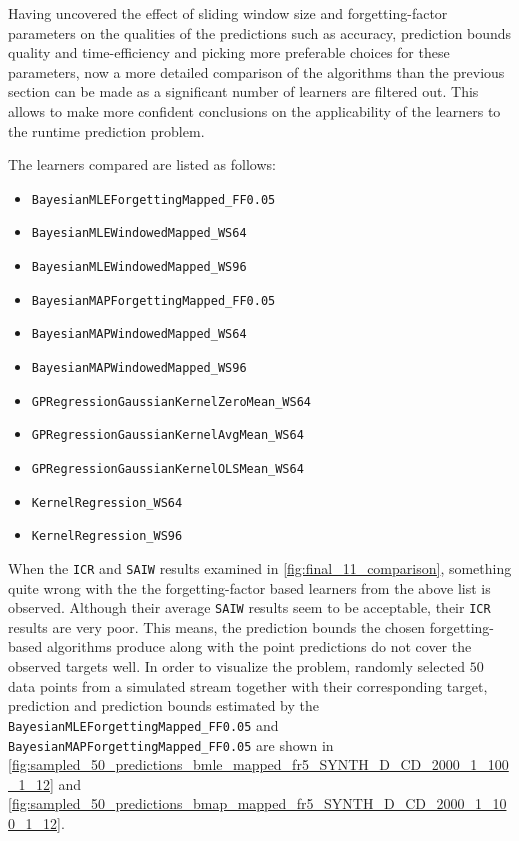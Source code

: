 Having uncovered the effect of sliding window size and forgetting-factor parameters on the qualities of the predictions such as accuracy, prediction bounds quality and time-efficiency and picking more preferable choices for these parameters, now a more detailed comparison of the algorithms than the previous section can be made as a significant number of learners are filtered out. This allows to make more confident conclusions on the applicability of the learners to the runtime prediction problem.

The learners compared are listed as follows:

\begin{itemize}
\label{final_11}
\item \texttt{BayesianMLEForgettingMapped\_FF0.05}
\item \texttt{BayesianMLEWindowedMapped\_WS64} 
\item \texttt{BayesianMLEWindowedMapped\_WS96}
\item \texttt{BayesianMAPForgettingMapped\_FF0.05}
\item \texttt{BayesianMAPWindowedMapped\_WS64} 
\item \texttt{BayesianMAPWindowedMapped\_WS96}
\item \texttt{GPRegressionGaussianKernelZeroMean\_WS64}
\item \texttt{GPRegressionGaussianKernelAvgMean\_WS64}
\item \texttt{GPRegressionGaussianKernelOLSMean\_WS64}
\item \texttt{KernelRegression\_WS64}
\item \texttt{KernelRegression\_WS96}
\end{itemize}

When the \texttt{ICR} and \texttt{SAIW} results examined in \ref{fig:final_11_comparison}, something quite wrong with the the forgetting-factor based learners from the above list is observed. Although their average \texttt{SAIW} results seem to be acceptable, their \texttt{ICR} results are very poor. This means, the prediction bounds the chosen forgetting-based algorithms produce along with the point predictions do not cover the observed targets well. In order to visualize the problem, randomly selected $50$ data points from a simulated stream together with their corresponding target, prediction and prediction bounds estimated by the \texttt{BayesianMLEForgettingMapped\_FF0.05} and \texttt{BayesianMAPForgettingMapped\_FF0.05} are shown in \ref{fig:sampled_50_predictions_bmle_mapped_fr5_SYNTH_D_CD_2000_1_100_1_12} and \ref{fig:sampled_50_predictions_bmap_mapped_fr5_SYNTH_D_CD_2000_1_100_1_12}.

